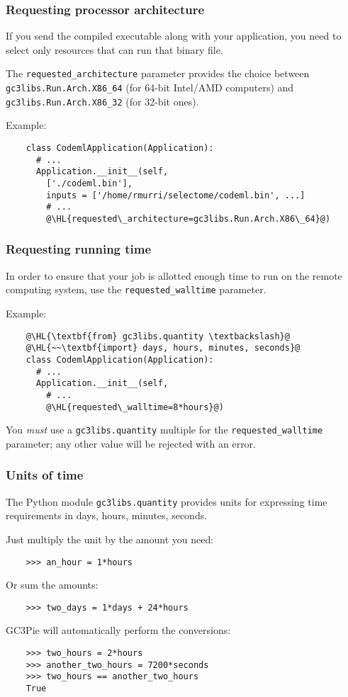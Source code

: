 \documentclass[english,serif,mathserif,xcolor=pdftex,dvipsnames,table]{beamer}
\begin{document}
\begin{frame}[fragile]
  \frametitle{Requesting processor architecture}

  If you send the compiled executable along with your application, you
  need to select only resources that can run that binary file.

  \+
  The \lstinline|requested_architecture| parameter provides the
  choice between \lstinline|gc3libs.Run.Arch.X86_64| (for 64-bit
  Intel/AMD computers) and \lstinline|gc3libs.Run.Arch.X86_32| (for
  32-bit ones).

  \+
  Example:
  \begin{lstlisting}
    class CodemlApplication(Application):
      # ...
      Application.__init__(self,
        ['./codeml.bin'],
        inputs = ['/home/rmurri/selectome/codeml.bin', ...]
        # ...
        @\HL{requested\_architecture=gc3libs.Run.Arch.X86\_64}@)
  \end{lstlisting}
\end{frame}

\begin{frame}[fragile]
  \frametitle{Requesting running time}

  In order to ensure that your job is allotted enough time to run on
  the remote computing system, use the \lstinline|requested_walltime|
  parameter.

  \+
  Example:
  \begin{lstlisting}
    @\HL{\textbf{from} gc3libs.quantity \textbackslash}@
    @\HL{~~\textbf{import} days, hours, minutes, seconds}@
    class CodemlApplication(Application):
      # ...
      Application.__init__(self,
        # ...
        @\HL{requested\_walltime=8*hours}@)
  \end{lstlisting}

  \+
  You \emph{must} use a \texttt{gc3libs.quantity} multiple for the
  \lstinline|requested_walltime| parameter; any other value will be
  rejected with an error.
\end{frame}

\begin{frame}[fragile]
  \frametitle{Units of time}
  The Python module \texttt{gc3libs.quantity} provides units for
  expressing time requirements in days, hours, minutes, seconds.

  \+
  Just multiply the unit by the amount you need:
  \begin{lstlisting}
    >>> an_hour = 1*hours
  \end{lstlisting}
  Or sum the amounts:
  \begin{lstlisting}
    >>> two_days = 1*days + 24*hours
  \end{lstlisting}

  \+
  GC3Pie will automatically perform the conversions:
  \begin{lstlisting}
    >>> two_hours = 2*hours
    >>> another_two_hours = 7200*seconds
    >>> two_hours == another_two_hours
    True
  \end{lstlisting}
\end{frame}
\end{document}
